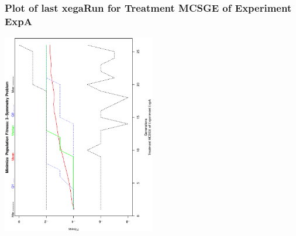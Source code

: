  \begin{frame}
 \frametitle{ Plot of last xegaRun for Treatment MCSGE of Experiment ExpA }
 \begin{center}
\includegraphics[width=0.5\textwidth, angle=-90]
{ExpAPlotPopStatsFigure000.eps}
 \end{center}
 \label{report/ExpAPlotPopStatsFigure000.eps}  
 \end{frame}

